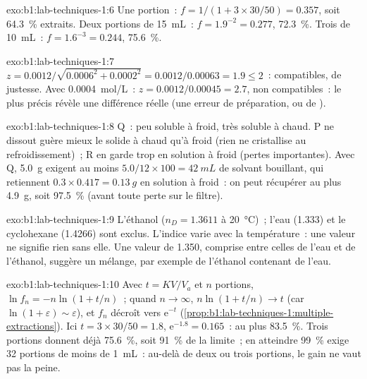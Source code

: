 \begin{solution}{exo:b1:lab-techniques-1:6}
Une portion~: $f = 1/(1 + 3 \times 30/50) = 0.357$, soit
\qty{64.3}{\percent} extraits. Deux portions de \qty{15}{mL}~:
$f = 1.9^{-2} = 0.277$,
\qty{72.3}{\percent}. Trois de \qty{10}{mL}~: $f = 1.6^{-3} = 0.244$,
\qty{75.6}{\percent}.
\end{solution}

\begin{solution}{exo:b1:lab-techniques-1:7}
$z = 0.0012/\sqrt{0.0006^2 + 0.0002^2} = 0.0012/0.00063 = 1.9 \le 2$~:
compatibles, de justesse. Avec \qty{0.0004}{mol/L}~: $z = 0.0012/0.00045 = 2.7$,
non compatibles~: le  plus précis révèle une différence réelle
(une erreur de préparation, ou de ).
\end{solution}

\begin{solution}{exo:b1:lab-techniques-1:8}
Q~: peu soluble à froid, très soluble à chaud. P ne dissout guère mieux
le solide à chaud qu'à froid (rien ne cristallise au refroidissement)~;
R en garde trop en solution à froid (pertes importantes). Avec Q,
\qty{5.0}{g} exigent au moins
$5.0/12 \times 100 = \qty{42}{mL}$ de solvant bouillant, qui retiennent
$0.3 \times 0.417 = \qty{0.13}{g}$ en solution à froid~: on peut
récupérer au plus
\qty{4.9}{g}, soit \qty{97.5}{\percent} (avant toute perte sur le
filtre).
\end{solution}

\begin{solution}{exo:b1:lab-techniques-1:9}
L'éthanol ($n_D = 1.3611$ à \qty{20}{\celsius})~; l'eau (1.333) et le
cyclohexane (1.4266) sont exclus. L'indice varie avec la température~:
une valeur ne signifie rien sans elle. Une valeur de 1.350, comprise
entre celles de l'eau et de l'éthanol, suggère un mélange, par exemple
de l'éthanol contenant de l'eau.
\end{solution}

\begin{solution}{exo:b1:lab-techniques-1:10}
Avec $t = KV/V_a$ et $n$ portions, $\ln f_n = -n\ln(1 + t/n)$~; quand
$n \to \infty$, $n \ln(1 + t/n) \to t$ (car $\ln(1 + \varepsilon) \sim
\varepsilon$), et $f_n$ décroît vers $\mathrm{e}^{-t}$ (\cref{prop:b1:lab-techniques-1:multiple-extractions}).
Ici $t = 3 \times 30/50 = 1.8$, $\mathrm{e}^{-1.8} = 0.165$~: au plus
\qty{83.5}{\percent}. Trois portions donnent déjà \qty{75.6}{\percent},
soit \qty{91}{\percent} de la limite~; en atteindre \qty{99}{\percent}
exige 32 portions de moins de \qty{1}{mL}~: au-delà de deux ou trois
portions, le gain ne vaut pas la peine.
\end{solution}


